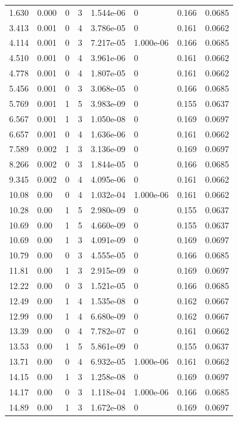 \documentclass[preview]{standalone}
\begin{document}
{{\begin{tabular}{L{1.2cm}C{1.2cm} C{0.3cm}C{0.5cm} C{1.4cm}C{1.4cm} C{1.4cm}C{1.4cm}}
  1.630  &  0.000  & 0     &  3 &  1.544e-06  & 0  & 0.166 &  0.0685   \\ 
  3.413  &  0.001  & 0     &  4 &  3.786e-05  & 0  & 0.161 &  0.0662   \\ 
  4.114  &  0.001  & 0     &  3 &  7.217e-05  & 1.000e-06  & 0.166 &  0.0685   \\ 
  4.510  &  0.001  & 0     &  4 &  3.961e-06  & 0  & 0.161 &  0.0662   \\ 
  4.778  &  0.001  & 0     &  4 &  1.807e-05  & 0  & 0.161 &  0.0662   \\ 
  5.456  &  0.001  & 0     &  3 &  3.068e-05  & 0  & 0.166 &  0.0685   \\ 
  5.769  &  0.001  & 1     &  5 &  3.983e-09  & 0  & 0.155 &  0.0637   \\ 
  6.567  &  0.001  & 1     &  3 &  1.050e-08  & 0  & 0.169 &  0.0697   \\ 
  6.657  &  0.001  & 0     &  4 &  1.636e-06  & 0  & 0.161 &  0.0662   \\ 
  7.589  &  0.002  & 1     &  3 &  3.136e-09  & 0  & 0.169 &  0.0697   \\ 
  8.266  &  0.002  & 0     &  3 &  1.844e-05  & 0  & 0.166 &  0.0685   \\ 
  9.345  &  0.002  & 0     &  4 &  4.095e-06  & 0  & 0.161 &  0.0662   \\ 
  10.08  &  0.00  & 0     &  4 &  1.032e-04  & 1.000e-06  & 0.161 &  0.0662   \\ 
  10.28  &  0.00  & 1     &  5 &  2.980e-09  & 0  & 0.155 &  0.0637   \\ 
  10.69  &  0.00  & 1     &  5 &  4.660e-09  & 0  & 0.155 &  0.0637   \\ 
  10.69  &  0.00  & 1     &  3 &  4.091e-09  & 0  & 0.169 &  0.0697   \\ 
  10.79  &  0.00  & 0     &  3 &  4.555e-05  & 0  & 0.166 &  0.0685   \\ 
  11.81  &  0.00  & 1     &  3 &  2.915e-09  & 0  & 0.169 &  0.0697   \\ 
  12.22  &  0.00  & 0     &  3 &  1.521e-05  & 0  & 0.166 &  0.0685   \\ 
  12.49  &  0.00  & 1     &  4 &  1.535e-08  & 0  & 0.162 &  0.0667   \\ 
  12.99  &  0.00  & 1     &  4 &  6.680e-09  & 0  & 0.162 &  0.0667   \\ 
  13.39  &  0.00  & 0     &  4 &  7.782e-07  & 0  & 0.161 &  0.0662   \\ 
  13.53  &  0.00  & 1     &  5 &  5.861e-09  & 0  & 0.155 &  0.0637   \\ 
  13.71  &  0.00  & 0     &  4 &  6.932e-05  & 1.000e-06  & 0.161 &  0.0662   \\ 
  14.15  &  0.00  & 1     &  3 &  1.258e-08  & 0  & 0.169 &  0.0697   \\ 
  14.17  &  0.00  & 0     &  3 &  1.118e-04  & 1.000e-06  & 0.166 &  0.0685   \\ 
  14.89  &  0.00  & 1     &  3 &  1.672e-08  & 0  & 0.169 &  0.0697   \\ 
\hline 
\end{tabular} 

}}
\end{document}
